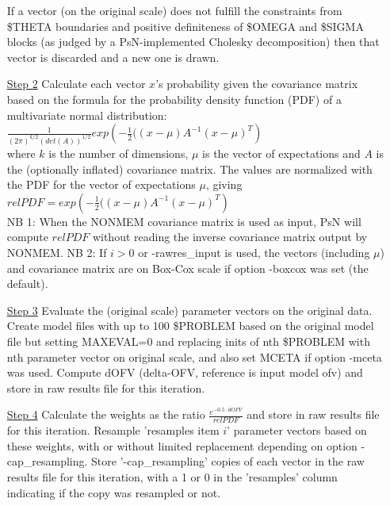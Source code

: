 \begin{itemize}
\noindent If a vector (on the original scale) does not fulfill the constraints from \$THETA boundaries
and positive definiteness of \$OMEGA and
\$SIGMA blocks (as judged by a PsN-implemented Cholesky decomposition) 
then that vector is 
discarded and a new one is drawn.
\item[\underline{Step 2}] 
Calculate each vector $x$’s probability 
given the covariance matrix based on the formula for the probability 
density function (PDF) of a multivariate normal distribution:\\
\begin{math}
\frac{1}{\left(2\pi\right)^{k/2}\left(det\left(A\right)\right)^{1/2}} exp\left(-\frac{1}{2}(\left(x-\mu\right)A^{-1} \left(x-\mu\right)^T\right)
\end{math}
\\
where $k$ is the number of dimensions, 
$\mu$ is the vector of expectations and $A$ is the (optionally inflated) covariance matrix.
The values are normalized with the PDF for the vector of expectations $\mu$, giving\\
\begin{math}
relPDF=exp\left(-\frac{1}{2}(\left(x-\mu\right)A^{-1} \left(x-\mu\right)^T\right)
\end{math}
\\
NB 1: When the NONMEM covariance matrix is used as input, PsN will compute $relPDF$ without reading the inverse covariance matrix
output by NONMEM.
NB 2: If $i>0$ or -rawres\_input is used, the vectors (including $\mu$) and covariance matrix are on Box-Cox scale if option -boxcox was set (the default).
\item[\underline{Step 3}] 
Evaluate the (original scale) parameter vectors on the original data.
Create model files with up to 100 \$PROBLEM based on the original model file but setting MAXEVAL=0
and replacing inits of nth \$PROBLEM with nth parameter vector on original scale, and also set MCETA if option -mceta was used. Compute dOFV 
(delta-OFV, reference is input model ofv) and store in raw results file for this iteration.
\item[\underline{Step 4}] 
Calculate the weights as the ratio $\frac{e^{-0.5\cdot dOFV}}{relPDF}$ and store in raw results file for this iteration. 
Resample 'resamples item $i$' parameter vectors based on these weights, with or without limited replacement depending on option 
-cap\_resampling.
Store '-cap\_resampling' copies of each vector in the raw results file for this iteration, with a 1 or 0 in the 'resamples'
column indicating if the copy was resampled or not.


\end{itemize}
